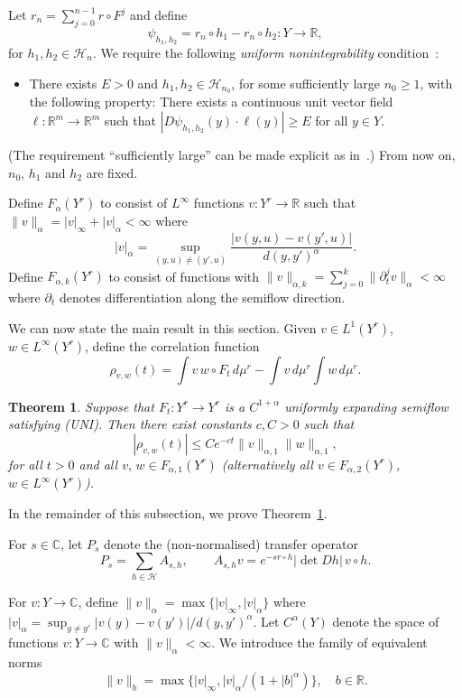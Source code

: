 \documentclass[12pt]{article}
\numberwithin{equation}{section}
\newtheorem{thm}{Theorem}[section]
\newcommand{\R}{{\mathbb R}}
\newcommand{\C}{{\mathbb C}}
\newcommand{\cH}{{\mathcal H}}
\begin{document}
Let $r_n=\sum_{j=0}^{n-1}r\circ F^j$ and define
\[
\psi_{h_1,h_2}=r_n\circ h_1-r_n\circ h_2 : Y\to\R,
\]
for $h_1,h_2\in\cH_n$. We require the following \emph{uniform nonintegrability} condition~\cite[Equation~(6.6)]{AGY06}:
\begin{itemize}
\item[(UNI)] There exists $E>0$ and $h_1,h_2\in \cH_{n_0}$, for some sufficiently large $n_0\ge1$, with the following property: There exists a continuous unit vector field $\ell:\R^m\to\R^m$ such that $|D\psi_{h_1,h_2}(y)\cdot\ell(y)|\ge E$ for all $y\in Y$.
\end{itemize}
(The requirement ``sufficiently large'' can be made explicit as in~\cite[Equations~(2.1) to~(2.3)]{AraujoM16}.)
From now on, $n_0$, $h_1$ and $h_2$ are fixed.

Define $F_\alpha(Y^r)$ to consist of $L^\infty$ functions
$v:Y^r\to \R$ such that
$\|v\|_\alpha=|v|_\infty+|v|_\alpha<\infty$ where
\[
|v|_\alpha=\sup_{(y,u)\neq(y',u)}\frac{|v(y,u)-v(y',u)|}{d(y,y')^\alpha}.
\]
Define $F_{\alpha,k}(Y^r)$ to consist of functions
with $\|v\|_{\alpha,k}=\sum_{j=0}^k \|\partial_t^jv\|_\alpha<\infty$ where $\partial_t$ denotes differentiation along the semiflow direction.

We can now state the main result in this section.
Given $v\in L^1(Y^r)$, $w\in L^\infty(Y^r)$, define the correlation function
\[
\rho_{v,w}(t)=\int v\,w\circ F_t\,d\mu^r
-\int v\,d\mu^r \int w\,d\mu^r.
\]

\begin{thm} \label{thm:semiflow}
Suppose that $F_t:Y^r\to Y^r$ is a $C^{1+\alpha}$ uniformly expanding semiflow satisfying (UNI).
Then there exist constants $c,C>0$ such that
\[
|\rho_{v,w}(t)|\le C e^{-c t}\|v\|_{\alpha,1}\|w\|_{\alpha,1},
\]
for all $t>0$ and all $v,\,w\in F_{\alpha,1}(Y^r)$
(alternatively 
all $v\in F_{\alpha,2}(Y^r)$, $w\in L^\infty(Y^r)$).
\end{thm}

In the remainder of this subsection, we prove Theorem~\ref{thm:semiflow}.

For $s\in\C$, let $P_s$ denote the (non-normalised) transfer operator
\[
P_s=\sum_{h\in\cH}A_{s,h},
\qquad
A_{s,h}v=e^{-sr\circ h}|\det Dh|\,v\circ h .
\]

For $v:Y\to\C$, define $\|v\|_\alpha=\max\{|v|_\infty,|v|_\alpha\}$ where
$|v|_\alpha=\sup_{y\neq y'}|v(y)-v(y')|/d(y,y')^\alpha$.
Let $C^\alpha(Y)$ denote the space of functions $v:Y\to\C$ with $\|v\|_\alpha<\infty$.
We introduce the family of equivalent norms
\[
\|v\|_b=\max\{|v|_\infty, |v|_\alpha/(1+|b|^\alpha)\}, \quad b\in\R.
\]
\end{document}
